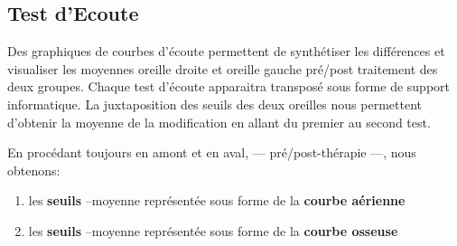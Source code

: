 \subsection*{Test d'Ecoute }
Des graphiques de courbes d'écoute permettent  de synthétiser les différences et visualiser les 
moyennes oreille droite et oreille gauche pré/post 
traitement des 
deux groupes. Chaque test d'écoute  apparaitra transposé  sous forme de support informatique.
 La juxtaposition des seuils des deux oreilles nous permettent d'obtenir la moyenne de la 
 modification en allant du 
 premier au second test.
 
En procédant toujours en amont et en aval, --- pré/post-thérapie ---, nous
obtenons:

\begin{enumerate}
	\item   les \textbf{seuils}  --moyenne
	représentée sous forme de la  \textbf{courbe aérienne}
	\item   les \textbf{seuils} --moyenne
	représentée sous forme de la \textbf{courbe osseuse}
\end{enumerate}

